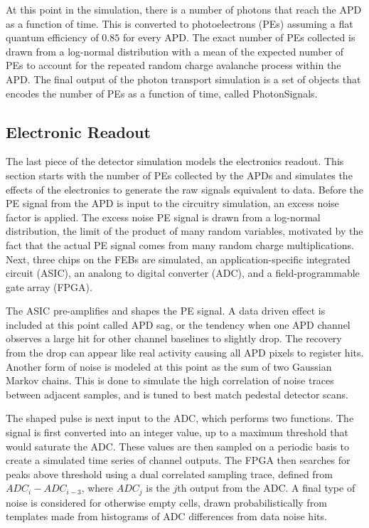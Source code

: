 At this point in the simulation, there is a number of photons that reach the APD as a function of time. This is converted to photoelectrons (PEs) assuming a flat quantum efficiency of $0.85$ for every APD. The exact number of PEs collected is drawn from a log-normal distribution with a mean of the expected number of PEs to account for the repeated random charge avalanche process within the APD. The final output of the photon transport simulation is a set of objects that encodes the number of PEs as a function of time, called PhotonSignals.

\subsection{Electronic Readout}
\label{sec:Electronics}

The last piece of the detector simulation models the electronics readout. This section starts with the number of PEs collected by the APDs and simulates the effects of the electronics to generate the raw signals equivalent to data. Before the PE signal from the APD is input to the circuitry simulation, an excess noise factor is applied. The excess noise PE signal is drawn from a log-normal distribution, the limit of the product of many random variables, motivated by the fact that the actual PE signal comes from many random charge multiplications. Next, three chips on the FEBs are simulated, an application-specific integrated circuit (ASIC), an analong to digital converter (ADC), and a field-programmable gate array (FPGA).

The ASIC pre-amplifies and shapes the PE signal. A data driven effect is included at this point called APD sag, or the tendency when one APD channel observes a large hit for other channel baselines to slightly drop. The recovery from the drop can appear like real activity causing all APD pixels to register hits. Another form of noise is modeled at this point as the sum of two Gaussian Markov chains. This is done to simulate the high correlation of noise traces between adjacent samples, and is tuned to best match pedestal detector scans.

The shaped pulse is next input to the ADC, which performs two functions. The signal is first converted into an integer value, up to a maximum threshold that would saturate the ADC. These values are then sampled on a periodic basis to create a simulated time series of channel outputs. The FPGA then searches for peaks above threshold using a dual correlated sampling trace, defined from $ADC_i - ADC_{i - 3}$, where $ADC_j$ is the $j$th output from the ADC. A final type of noise is considered for otherwise empty cells, drawn probabilistically from templates made from histograms of ADC differences from data noise hits.

